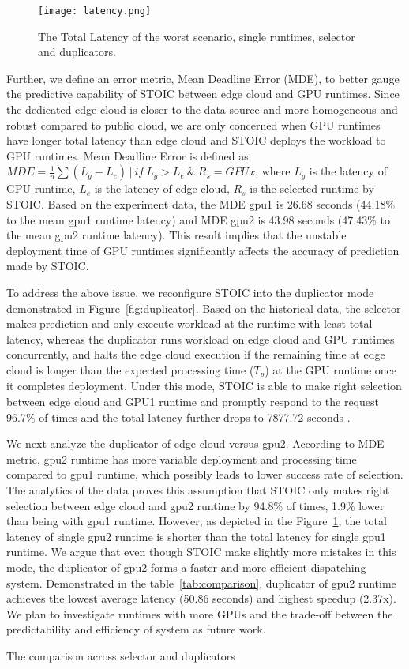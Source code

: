 \begin{figure}[t] \centering 
\texttt{[image: latency.png]}
\caption{The Total Latency of the worst scenario, single runtimes, selector and duplicators. }
\label{fig:latency}
\end{figure}

Further, we define an error metric, Mean Deadline Error (MDE), to better gauge the predictive capability of STOIC between edge cloud and GPU runtimes. Since the dedicated edge cloud is closer to the data source and more homogeneous and robust compared to public cloud, we are only concerned when GPU runtimes have longer total latency than edge cloud and STOIC deploys the workload to GPU runtimes. Mean Deadline Error is defined as $MDE = \frac{1}{n}\sum(L_g - L_e) \,|\ if \ L_g > L_e \ \& \ R_s = GPUx $, where $L_g$ is the latency of GPU runtime, $L_e$ is the latency of edge cloud, $R_s$ is the selected runtime by STOIC. Based on the experiment data, the MDE gpu1 is 26.68 seconds (44.18\% to the mean gpu1 runtime latency) and MDE gpu2 is 43.98 seconds (47.43\% to the mean gpu2 runtime latency). This result implies that the unstable deployment time of GPU runtimes significantly affects the accuracy of prediction made by STOIC. 

To address the above issue, we reconfigure STOIC into the duplicator mode demonstrated in Figure~\ref{fig:duplicator}. Based on the historical data, the selector makes prediction and only execute workload at the runtime with least total latency, whereas the duplicator runs workload on edge cloud and GPU runtimes concurrently, and halts the edge cloud execution if the remaining time at edge cloud is longer than the expected processing time ($T_p$) at the GPU runtime once it completes deployment. Under this mode, STOIC is able to make right selection between edge cloud and GPU1 runtime and promptly respond to the request 96.7\% of times and the total latency further drops to 7877.72 seconds . 

We next analyze the duplicator of edge cloud versus gpu2. According to MDE metric, gpu2 runtime has more variable deployment and processing time compared to gpu1 runtime, which possibly leads to lower success rate of selection. The analytics of the data proves this assumption that STOIC only makes right selection between edge cloud and gpu2 runtime by 94.8\% of times, 1.9\% lower than being with gpu1 runtime. However, as depicted in the Figure~\ref{fig:latency}, the total latency of single gpu2 runtime is shorter than the total latency for single gpu1 runtime. We argue that even though STOIC make slightly more mistakes in this mode, the duplicator of gpu2 forms a faster and more efficient dispatching system. Demonstrated in the table~\ref{tab:comparison}, duplicator of gpu2 runtime achieves the lowest average latency (50.86 seconds) and highest speedup (2.37x). We plan to investigate runtimes with more GPUs and the trade-off between the predictability and efficiency of system as future work.

\begin{table}[t] 
\centering
\captionsetup{justification=centering}

\caption{
The comparison across selector and duplicators}
\label{tab:comparison}
\end{table}